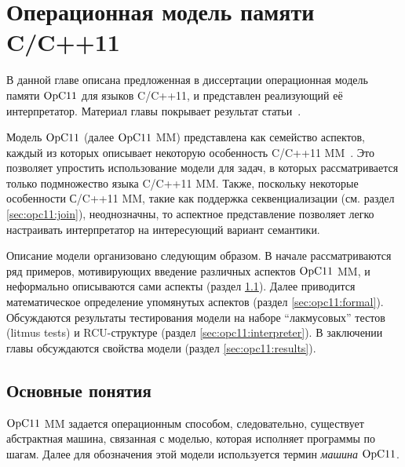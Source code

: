 \chapter{Операционная модель памяти C/C++11} \label{sec:opc11}
В данной главе описана предложенная в диссертации операционная модель
памяти $\mathrm{OpC11}$ для языков C/C++11, и представлен реализующий её интерпретатор.
Материал главы покрывает результат статьи~\cite{Podkopaev-al:CoRR16}.

Модель $\mathrm{OpC11}$ (далее $\mathrm{OpC11}$ MM) представлена как семейство аспектов, каждый из которых описывает некоторую особенность
C/C++11 MM~\cite{Batty-al:POPL11}.
Это позволяет упростить использование модели для задач, в которых рассматривается только подмножество
языка C/C++11 MM.
Также, поскольку некоторые особенности С/C++11 MM,
такие как поддержка секвенциализации (см. раздел \ref{sec:opc11:join}), неоднозначны,
то аспектное представление позволяет легко настраивать интерпретатор на интересующий
вариант семантики.


Описание модели организовано следующим образом.
В начале рассматриваются ряд примеров, мотивирующих введение
различных аспектов $\mathrm{OpC11}$ MM,
и неформально описываются сами аспекты (раздел \ref{sec:opc11:base}).
Далее приводится математическое определение упомянутых аспектов
(раздел \ref{sec:opc11:formal}).
Обсуждаются результаты тестирования модели на наборе ``лакмусовых'' тестов (litmus tests) и
RCU-структуре (раздел \ref{sec:opc11:interpreter}).
В заключении главы обсуждаются свойства модели (раздел \ref{sec:opc11:results}).

\section{Основные понятия}
\label{sec:opc11:base}
\label{sec:opc11:fullmodel}
$\mathrm{OpC11}$ MM задается операционным способом, следовательно, существует
абстрактная машина, связанная с моделью, которая исполняет программы
по шагам.
Далее для обозначения этой модели используется термин \emph{машина} $\mathrm{OpC11}$.


